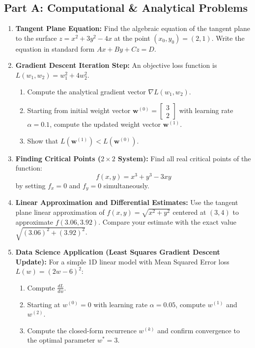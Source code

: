 \subsection*{Part A: Computational \& Analytical Problems}
\begin{enumerate}
\item \textbf{Tangent Plane Equation:} Find the algebraic equation of the tangent plane to the surface $z = x^2 + 3y^2 - 4x$ at the point $(x_0, y_0) = (2, 1)$. Write the equation in standard form $A x + B y + C z = D$.

\item \textbf{Gradient Descent Iteration Step:} An objective loss function is $L(w_1, w_2) = w_1^2 + 4 w_2^2$.
\begin{enumerate}
    \item Compute the analytical gradient vector $\nabla L(w_1, w_2)$.
    \item Starting from initial weight vector $\mathbf{w}^{(0)} = \begin{bmatrix} 3 \\ 2 \end{bmatrix}$ with learning rate $\alpha = 0.1$, compute the updated weight vector $\mathbf{w}^{(1)}$.
    \item Show that $L(\mathbf{w}^{(1)}) < L(\mathbf{w}^{(0)})$.
\end{enumerate}

\item \textbf{Finding Critical Points ($2 \times 2$ System):} Find all real critical points of the function:
\begin{equation*}
f(x, y) = x^3 + y^3 - 3xy
\end{equation*}
by setting $f_x = 0$ and $f_y = 0$ simultaneously.

\item \textbf{Linear Approximation and Differential Estimates:} Use the tangent plane linear approximation of $f(x, y) = \sqrt{x^2 + y^2}$ centered at $(3, 4)$ to approximate $f(3.06, 3.92)$. Compare your estimate with the exact value $\sqrt{(3.06)^2 + (3.92)^2}$.

\item \textbf{Data Science Application (Least Squares Gradient Descent Update):} For a simple 1D linear model with Mean Squared Error loss $L(w) = (2w - 6)^2$:
\begin{enumerate}
    \item Compute $\frac{d L}{d w}$.
    \item Starting at $w^{(0)} = 0$ with learning rate $\alpha = 0.05$, compute $w^{(1)}$ and $w^{(2)}$.
    \item Compute the closed-form recurrence $w^{(k)}$ and confirm convergence to the optimal parameter $w^* = 3$.
\end{enumerate}
\end{enumerate}

